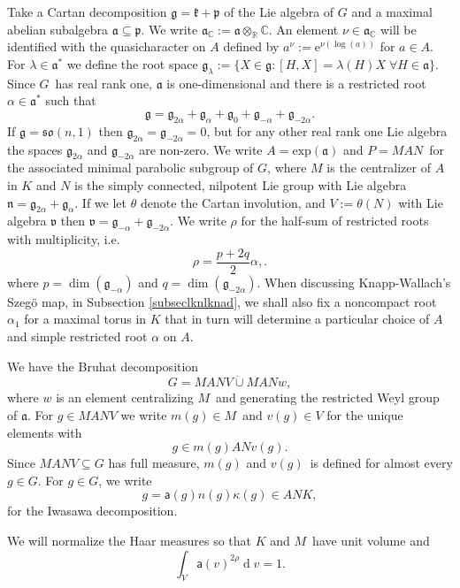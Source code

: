 \documentclass[a4paper,reqno]{amsart}
\numberwithin{equation}{section}
\def\dim{\operatorname{dim}}
\def\rd{\operatorname{d}\!}
\def\C{\mathbb{C}}
\def\R{\mathbb{R}}
\theoremstyle{definition}
\theoremstyle{remark}
\begin{document}
Take a Cartan decomposition $\mathfrak{g}=\mathfrak{k}+\mathfrak{p}$ of the Lie algebra of $G$ and a maximal abelian subalgebra $\mathfrak{a}\subseteq \mathfrak{p}$. We write $\mathfrak{a}_\C:=\mathfrak{a}\otimes_\R\C$. An element $\nu\in \mathfrak{a}_\C$ will be identified with the quasicharacter on $A$ defined by $a^\nu:=\mathrm{e}^{\nu(\log(a))}$ for $a\in A$. For $\lambda\in \mathfrak{a}^*$ we define the root space $\mathfrak{g}_\lambda:=\{X\in \mathfrak{g}: [H,X]=\lambda(H)X\; \forall H\in \mathfrak{a}\}$. Since $G$ has real rank one, $\mathfrak{a}$ is one-dimensional and there is a restricted root $\alpha\in \mathfrak{a}^*$ such that 
$$\mathfrak{g}=\mathfrak{g}_{2\alpha}+\mathfrak{g}_\alpha+\mathfrak{g}_0+\mathfrak{g}_{-\alpha}+\mathfrak{g}_{-2\alpha}.$$
If $\mathfrak{g}=\mathfrak{so}(n,1)$ then $\mathfrak{g}_{2\alpha}=\mathfrak{g}_{-2\alpha}=0$, but for any other real rank one Lie algebra the spaces $\mathfrak{g}_{2\alpha}$ and $\mathfrak{g}_{-2\alpha}$ are non-zero. We write $A=\mathrm{exp}(\mathfrak{a})$ and $P=MAN$ for the associated minimal parabolic subgroup of $G$, where $M$ is the centralizer of $A$ in $K$ and $N$ is the simply connected, nilpotent Lie group with Lie algebra $\mathfrak{n}=\mathfrak{g}_{2\alpha}+\mathfrak{g}_\alpha$. If we let $\theta$ denote the Cartan involution, and $V:=\theta(N)$ with Lie algebra $\mathfrak{v}$ then $\mathfrak{v}=\mathfrak{g}_{-\alpha}+\mathfrak{g}_{-2\alpha}$. We write $\rho$ for the half-sum of restricted roots with multiplicity, i.e. 
$$\rho=\frac{p+2q}{2}\alpha,.$$
where $p=\dim(\mathfrak{g}_{-\alpha})$ and $q=\dim(\mathfrak{g}_{-2\alpha})$. When discussing Knapp-Wallach's Szegö map, in Subsection \ref{subseclknlknad}, we shall also fix a noncompact root $\alpha_1$ for a maximal torus in $K$ that in turn will determine a particular choice of $A$ and simple restricted root $\alpha$ on $A$. 

We have the Bruhat decomposition 
$$G=MANV\dot{\cup} MANw,$$
where $w$ is an element centralizing $M$ and generating the restricted Weyl group of $\mathfrak{a}$. For $g\in MANV$ we write $m(g)\in M$ and $v(g)\in V$ for the unique elements with 
$$g\in m(g)ANv(g).$$
Since $MANV\subseteq G$ has full measure, $m(g)$ and $v(g)$ is defined for almost every $g\in G$. For $g\in G$, we write 
$$g=\mathsf{a}(g)n(g)\kappa(g)\in ANK,$$
for the Iwasawa decomposition. 

We will normalize the Haar measures so that $K$ and $M$ have unit volume and 
\begin{equation}
\label{normalz}
\int_V \mathsf{a}(v)^{2\rho}\rd v=1.
\end{equation}
\end{document}
